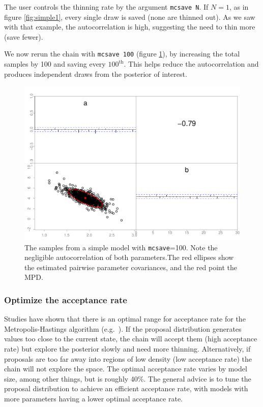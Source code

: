 \documentclass{article}\usepackage[]{graphicx}\usepackage[]{color}
\begin{document}
The user controls the thinning rate by the argument
\texttt{mcsave N}. If $N=1$, as in figure \ref{fig:simple1},
every single draw is saved (none are thinned out). As we saw
with that example, the autocorrelation is high, suggesting
the need to thin more (save fewer).

We now rerun the chain with \texttt{mcsave 100} (figure
\ref{fig:simple2}), by increasing the total samples by
100 and saving every $100^{\text{th}}$. This helps reduce
the autocorrelation and produces independent draws from the
posterior of interest.
\begin{figure}[h]
  \centering
  \includegraphics[width=5in]{../plots/simple2.pdf}
  \caption{The samples from a simple model with
    \texttt{mcsave}=100. Note the negligible autocorrelation
    of both parameters.The red ellipses show the estimated
    pairwise parameter covariances, and the red point the
    MPD.}
  \label{fig:simple2}
\end{figure}


\subsubsection{Optimize the acceptance rate}\label{sec:accept.rate}
Studies have shown that there is an optimal range for
acceptance rate for the Metropolis-Hastings algorithm (e.g.\
\cite{roberts2001}). If the proposal distribution generates
values too close to the current state, the chain will accept
them (high acceptance rate) but explore the posterior slowly
and need more thinning. Alternatively, if proposals are too
far away into regions of low density (low acceptance rate)
the chain will not explore the space. The optimal acceptance
rate varies by model size, among other things, but is
roughly 40\%. The general advice is to tune the proposal
distribution to achieve an efficient acceptance rate, with
models with more parameters having a lower optimal
acceptance rate.
\end{document}
